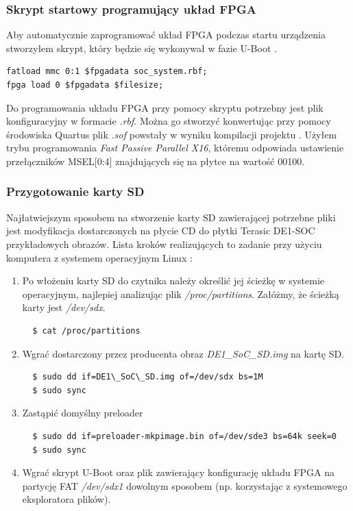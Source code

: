 \subsubsection{Skrypt startowy programujący układ FPGA}
Aby automatycznie zaprogramować układ FPGA podczas startu urządzenia stworzyłem skrypt, który będzie się wykonywał w fazie U-Boot \cite{rocketboards-uboot-script}.
\begin{lstlisting}
fatload mmc 0:1 $fpgadata soc_system.rbf;
fpga load 0 $fpgadata $filesize;
\end{lstlisting}
Do programowania układu FPGA przy pomocy skryptu potrzebny jest plik konfiguracyjny w formacie \textit{.rbf}. Można go stworzyć konwertując przy pomocy środowiska Quartus plik \textit{.sof} powstały w wyniku kompilacji projektu \cite{rocketboards-sof-to-rfb}. Użyłem trybu programowania \textit{Fast Passive Parallel X16}, któremu odpowiada ustawienie przełączników MSEL[0:4] znajdujących się na płytce na wartość 00100.

\subsubsection{Przygotowanie karty SD}
Najłatwiejszym sposobem na stworzenie karty SD zawierającej potrzebne pliki jest modyfikacja dostarczonych na płycie CD do płytki Terasic DE1-SOC przykładowych obrazów. Lista kroków realizujących to zadanie przy użyciu komputera z systemem operacyjnym Linux \cite{rocketboards-booting-prebuild, rocketboards-updating-sd}:
\begin{enumerate}
\item Po włożeniu karty SD do czytnika należy określić jej ścieżkę w systemie operacyjnym, najlepiej analizując plik \textit{/proc/partitions}. Załóżmy, że ścieżką karty jest \textit{/dev/sdx}.
\begin{lstlisting}
  $ cat /proc/partitions
\end{lstlisting}

\item Wgrać dostarczony przez producenta obraz \textit{DE1\_SoC\_SD.img} na kartę SD.
\begin{lstlisting}
  $ sudo dd if=DE1\_SoC\_SD.img of=/dev/sdx bs=1M
  $ sudo sync
\end{lstlisting}

\item Zastąpić domyślny preloader
\begin{lstlisting}
  $ sudo dd if=preloader-mkpimage.bin of=/dev/sde3 bs=64k seek=0
  $ sudo sync
\end{lstlisting}

\item Wgrać skrypt U-Boot oraz plik zawierający konfigurację układu FPGA na partycję FAT \textit{/dev/sdx1} dowolnym sposobem (np. korzystając z systemowego eksploratora plików).
\end{enumerate}

